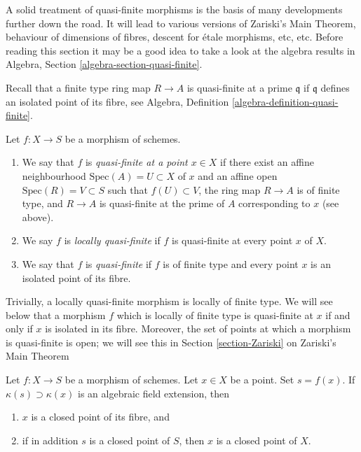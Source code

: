 \noindent
A solid treatment of quasi-finite morphisms is the basis of many developments
further down the road. It will lead to various versions of Zariski's Main
Theorem, behaviour of dimensions of fibres, descent for \'etale morphisms, etc,
etc. Before reading this section it may be a good idea to take a look at
the algebra results in Algebra, Section \ref{algebra-section-quasi-finite}.

\medskip\noindent
Recall that a finite type ring map $R \to A$ is quasi-finite at
a prime $\mathfrak q$ if $\mathfrak q$ defines an isolated point
of its fibre, see Algebra, Definition \ref{algebra-definition-quasi-finite}.

\begin{definition}
\label{definition-quasi-finite}
Let $f : X \to S$ be a morphism of schemes.
\begin{enumerate}
\item We say that $f$ is {\it quasi-finite at a point $x \in X$}
if there exist an affine neighbourhood $\text{Spec}(A) = U \subset X$
of $x$ and an affine open $\text{Spec}(R) = V \subset S$ such that
$f(U) \subset V$, the ring map $R \to A$ is of finite type,
and $R \to A$ is quasi-finite at the prime of $A$ corresponding to $x$
(see above).
\item We say $f$ is {\it locally quasi-finite} if $f$ is
quasi-finite at every point $x$ of $X$.
\item We say that $f$ is {\it quasi-finite} if $f$ is of finite type
and every point $x$ is an isolated point of its fibre.
\end{enumerate}
\end{definition}

\noindent
Trivially, a locally quasi-finite morphism is locally of finite type.
We will see below that a morphism $f$ which is locally of finite type
is quasi-finite at $x$ if and only if $x$ is isolated in its fibre.
Moreover, the set of points at which a morphism is quasi-finite is open;
we will see this in Section \ref{section-Zariski} on Zariski's Main Theorem

\begin{lemma}
\label{lemma-algebraic-residue-field-extension-closed-point-fibre}
Let $f : X \to S$ be a morphism of schemes.
Let $x \in X$ be a point. Set $s = f(x)$.
If $\kappa(s) \supset \kappa(x)$
is an algebraic field extension, then
\begin{enumerate}
\item $x$ is a closed point of its fibre, and
\item if in addition $s$ is a closed point of $S$, then
$x$ is a closed point of $X$.
\end{enumerate}
\end{lemma}

